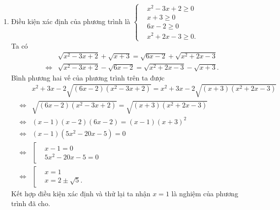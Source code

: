 \begin{bt}
{\begin{enumerate}
			Ta có
			\allowdisplaybreaks
			\begin{eqnarray*}
				&& \sqrt{3x+4}-\sqrt{2x+1}=\sqrt{x+3}\\
				&\Leftrightarrow & \sqrt{3x+4}=\sqrt{2x+1}+\sqrt{x+3}\\
				&\Leftrightarrow & 3x+4=2x+1+2\sqrt{(2x+1)(x+3)}+x+3\\
				&\Leftrightarrow & \sqrt{(2x+1)(3x+4)}=0\\
				&\Leftrightarrow & \left[\begin{aligned}&x=-\dfrac{1}{2} \\&x=-3.\end{aligned}\right.
			\end{eqnarray*}
			Kết hợp điều kiện xác định ta nhận $x=-\dfrac{1}{2}$ là nghiệm của phương trình đã cho.
			\item Điều kiện xác định của phương trình là $\left\{\begin{aligned}&x^2-3x+2 \geq 0 \\&x+3\geq 0 \\&6x-2\geq 0 \\&x^2+2x-3 \geq 0.\end{aligned}\right.$\\
			Ta có
			\begin{eqnarray*}
				&& \sqrt{x^2-3x+2}+\sqrt{x+3}=\sqrt{6x-2}+\sqrt{x^2+2x-3}\\
				&\Leftrightarrow & \sqrt{x^2-3x+2}-\sqrt{6x-2}=\sqrt{x^2+2x-3}-\sqrt{x+3}.
			\end{eqnarray*}
			Bình phương hai vế của phương trình trên ta được
			\allowdisplaybreaks
			\begin{eqnarray*}
				&& x^2+3x-2\sqrt{(6x-2)(x^2-3x+2)}=x^2+3x-2\sqrt{(x+3)(x^2+2x-3)}\\
				&\Leftrightarrow & \sqrt{(6x-2)(x^2-3x+2)}=\sqrt{(x+3)(x^2+2x-3)}\\
				&\Leftrightarrow & (x-1)(x-2)(6x-2)=(x-1)(x+3)^2\\
				&\Leftrightarrow & (x-1)(5x^2-20x-5)=0\\
				&\Leftrightarrow & \left[\begin{aligned}&x-1=0 \\&5x^2-20x-5=0\end{aligned}\right.\\
				&\Leftrightarrow & \left[\begin{aligned}&x=1 \\&x=2\pm\sqrt{5}.\end{aligned}\right.
			\end{eqnarray*}
			Kết hợp điều kiện xác định và thử lại ta nhận $x=1$ là nghiệm của phương trình đã cho.
		\end{enumerate}
	}
\end{bt}

